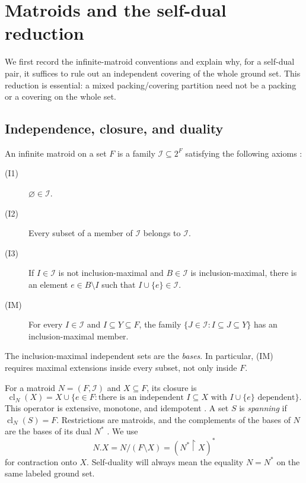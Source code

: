 \section{Matroids and the self-dual reduction}\label{sec:matroids}

We first record the infinite-matroid conventions and explain why, for a
self-dual pair, it suffices to rule out an independent covering of the
whole ground set. This reduction is essential: a mixed packing/covering
partition need not be a packing or a covering on the whole set.

\subsection{Independence, closure, and duality}

An infinite matroid on a set $F$ is a family $\mathcal I\subseteq 2^F$
satisfying the following axioms
\cite[Section~1.1]{BDKPW2013}:
\begin{description}
\item[(I1)] $\varnothing\in\mathcal I$.
\item[(I2)] Every subset of a member of $\mathcal I$ belongs to $\mathcal I$.
\item[(I3)] If $I\in\mathcal I$ is not inclusion-maximal and
  $B\in\mathcal I$ is inclusion-maximal, there is an element
  $e\in B\setminus I$ such that $I\cup\{e\}\in\mathcal I$.
\item[(IM)] For every $I\in\mathcal I$ and $I\subseteq Y\subseteq F$,
  the family $\{J\in\mathcal I:I\subseteq J\subseteq Y\}$ has an
  inclusion-maximal member.
\end{description}
The inclusion-maximal independent sets are the \emph{bases}. In
particular, (IM) requires maximal extensions inside every subset, not
only inside $F$.

For a matroid $N=(F,\mathcal I)$ and $X\subseteq F$, its closure is
\[
 \operatorname{cl}_N(X)=X\cup
 \{e\in F:\text{there is an independent }I\subseteq X
                 \text{ with }I\cup\{e\}\text{ dependent}\}.
\]
This operator is extensive, monotone, and idempotent
\cite[Theorem~4.2]{BDKPW2013}. A set $S$ is \emph{spanning} if
$\operatorname{cl}_N(S)=F$.
Restrictions are matroids, and the complements of the bases of $N$
are the bases of its dual $N^*$
\cite[Theorems~3.1 and~3.4]{BDKPW2013}. We use
\[
 N.X=N/(F\setminus X)=(N^*\!\upharpoonright X)^*
\]
for contraction onto $X$. Self-duality will always mean the equality
$N=N^*$ on the same labeled ground set.

